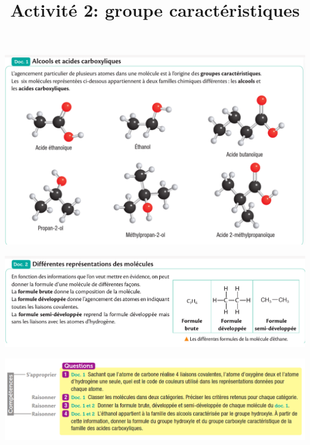 \documentclass[10pt]{article}
\newcommand{\titreActivite}{Activité 2: groupe caractéristiques} %
\begin{document}
\date{}
\title{\titreActivite}
\maketitle %


\begin{center}
	\includegraphics[scale=0.4]{assets/d1.png}

	\vspace{10pt}

	\includegraphics[scale=0.3]{assets/d2.png}

	\vspace{10pt}

	\includegraphics[scale=0.35]{assets/q}

\end{center}
\end{document}
